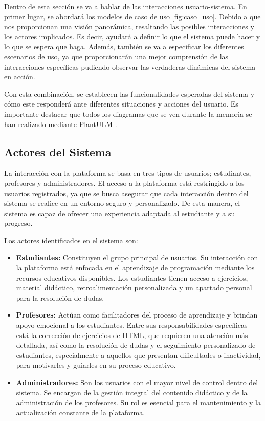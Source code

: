 Dentro de esta sección se va a hablar de las interacciones usuario-sistema. En primer lugar, se abordará los modelos de caso de uso \ref{fig:caso_uso}. Debido a que nos proporcionan una visión panorámica, resaltando las posibles interacciones y los actores implicados. Es decir, ayudará a definir lo que el sistema puede hacer y lo que se espera que haga. Además, también se va a especificar los diferentes escenarios de uso, ya que proporcionarán una mejor comprensión de las interacciones específicas pudiendo observar las verdaderas dinámicas del sistema en acción.

Con esta combinación, se establecen las funcionalidades esperadas del sistema y cómo este responderá ante diferentes situaciones y acciones del usuario. Es importante destacar que todos los diagramas que se ven durante la memoria se han realizado mediante PlantULM \cite{planttext}. 

\subsection{Actores del Sistema}

La interacción con la plataforma se basa en tres tipos de usuarios; estudiantes, profesores y administradores. El acceso a la plataforma está restringido a los usuarios registrados, ya que se busca asegurar que cada interacción dentro del sistema se realice en un entorno seguro y personalizado. De esta manera, el sistema es capaz de ofrecer una experiencia adaptada al estudiante y a su progreso.

Los actores identificados en el sistema son:

\begin{itemize}
    \item \textbf{Estudiantes:} Constituyen el grupo principal de usuarios. Su interacción con la plataforma está enfocada en el aprendizaje de programación mediante los recursos educativos disponibles. Los estudiantes tienen acceso a ejercicios, material didáctico, retroalimentación personalizada y un apartado personal para la resolución de dudas.
    \item \textbf{Profesores:} Actúan como facilitadores del proceso de aprendizaje y brindan apoyo emocional a los estudiantes. Entre sus responsabilidades específicas está la corrección de ejercicios de HTML, que requieren una atención más detallada, así como la resolución de dudas y el seguimiento personalizado de estudiantes, especialmente a aquellos que presentan dificultades o inactividad, para motivarles y guiarles en su proceso educativo.
    \item \textbf{Administradores:} Son los usuarios con el mayor nivel de control dentro del sistema. Se encargan de la gestión integral del contenido didáctico y de la administración de los profesores. Su rol es esencial para el mantenimiento y la actualización constante de la plataforma.
\end{itemize}


